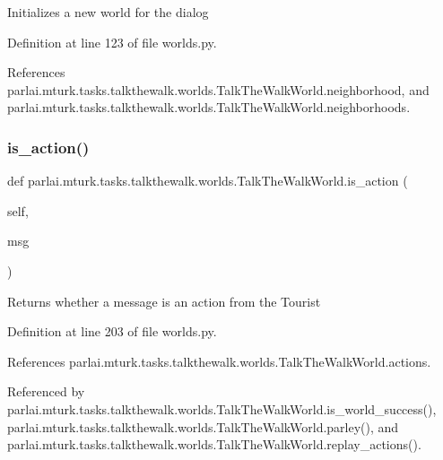 \begin{DoxyVerb}Initializes a new world for the dialog\end{DoxyVerb}
 

Definition at line 123 of file worlds.\+py.



References parlai.\+mturk.\+tasks.\+talkthewalk.\+worlds.\+Talk\+The\+Walk\+World.\+neighborhood, and parlai.\+mturk.\+tasks.\+talkthewalk.\+worlds.\+Talk\+The\+Walk\+World.\+neighborhoods.

\mbox{\label{classparlai_1_1mturk_1_1tasks_1_1talkthewalk_1_1worlds_1_1TalkTheWalkWorld_a39aaaabf0760ced0c5d73f80ce196521}} 
\subsubsection{\texorpdfstring{is\+\_\+action()}{is\_action()}}
{\footnotesize\ttfamily def parlai.\+mturk.\+tasks.\+talkthewalk.\+worlds.\+Talk\+The\+Walk\+World.\+is\+\_\+action (\begin{DoxyParamCaption}\item[{}]{self,  }\item[{}]{msg }\end{DoxyParamCaption})}

\begin{DoxyVerb}Returns whether a message is an action from the Tourist\end{DoxyVerb}
 

Definition at line 203 of file worlds.\+py.



References parlai.\+mturk.\+tasks.\+talkthewalk.\+worlds.\+Talk\+The\+Walk\+World.\+actions.



Referenced by parlai.\+mturk.\+tasks.\+talkthewalk.\+worlds.\+Talk\+The\+Walk\+World.\+is\+\_\+world\+\_\+success(), parlai.\+mturk.\+tasks.\+talkthewalk.\+worlds.\+Talk\+The\+Walk\+World.\+parley(), and parlai.\+mturk.\+tasks.\+talkthewalk.\+worlds.\+Talk\+The\+Walk\+World.\+replay\+\_\+actions().

